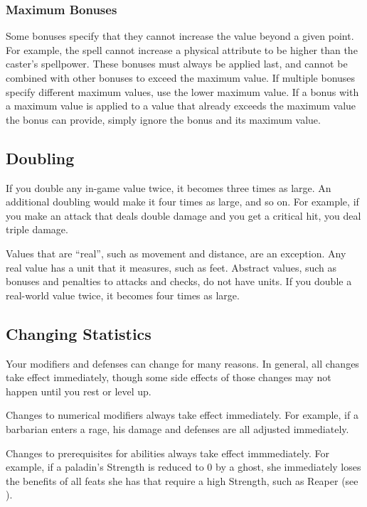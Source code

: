        \subsubsection{Maximum Bonuses}\label{Ability Limits}
            Some bonuses specify that they cannot increase the value beyond a given point.
            For example, the  spell cannot increase a physical attribute to be higher than the caster's spellpower.
            These bonuses must always be applied last, and cannot be combined with other bonuses to exceed the maximum value.
            If multiple bonuses specify different maximum values, use the lower maximum value.
            If a bonus with a maximum value is applied to a value that already exceeds the maximum value the bonus can provide, simply ignore the bonus and its maximum value.

    \subsection{Doubling}\label{Doubling}
        If you double any in-game value twice, it becomes three times as large. An additional doubling would make it four times as large, and so on. For example, if you make an attack that deals double damage and you get a critical hit, you deal triple damage.

         Values that are ``real'', such as movement and distance, are an exception.
        Any real value has a unit that it measures, such as feet.
        Abstract values, such as bonuses and penalties to attacks and checks, do not have units.
        If you double a real-world value twice, it becomes four times as large.

    \subsection{Changing Statistics}

        Your modifiers and defenses can change for many reasons.
        In general, all changes take effect immediately, though some side effects of those changes may not happen until you rest or level up.

         Changes to numerical modifiers always take effect immediately.
        For example, if a barbarian enters a rage, his damage and defenses are all adjusted immediately.

         Changes to prerequisites for abilities always take effect immmediately.
        For example, if a paladin's Strength is reduced to 0 by a ghost, she immediately loses the benefits of all feats she has that require a high Strength, such as Reaper (see ).

